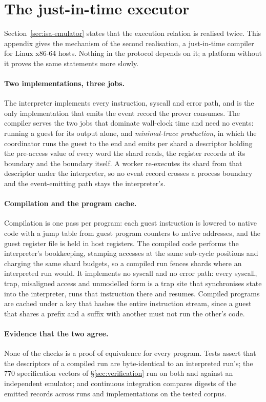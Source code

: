 \section{The just-in-time executor}
\label{sec:executor}

Section~\ref{sec:isa-emulator} states that the execution relation is realised twice. This appendix gives the mechanism of the second realisation, a just-in-time compiler for Linux x86-64 hosts. Nothing in the protocol depends on it; a platform without it proves the same statements more slowly.

\paragraph{Two implementations, three jobs.}\label{sec:exec-roles} The interpreter implements every instruction, syscall and error path, and is the only implementation that emits the event record the prover consumes. The compiler serves the two jobs that dominate wall-clock time and need no events: running a guest for its output alone, and \emph{minimal-trace production}, in which the coordinator runs the guest to the end and emits per shard a descriptor holding the pre-access value of every word the shard reads, the register records at its boundary and the boundary itself. A worker re-executes its shard from that descriptor under the interpreter, so no event record crosses a process boundary and the event-emitting path stays the interpreter's.

\paragraph{Compilation and the program cache.}\label{sec:exec-transpile}\label{sec:exec-state}\label{sec:exec-accounting}\label{sec:exec-traps} Compilation is one pass per program: each guest instruction is lowered to native code with a jump table from guest program counters to native addresses, and the guest register file is held in host registers. The compiled code performs the interpreter's bookkeeping, stamping accesses at the same sub-cycle positions and charging the same shard budgets, so a compiled run fences shards where an interpreted run would. It implements no syscall and no error path: every syscall, trap, misaligned access and unmodelled form is a trap site that synchronises state into the interpreter, runs that instruction there and resumes. Compiled programs are cached under a key that hashes the entire instruction stream, since a guest that shares a prefix and a suffix with another must not run the other's code.

\paragraph{Evidence that the two agree.}\label{sec:exec-equivalence} None of the checks is a proof of equivalence for every program. Tests assert that the descriptors of a compiled run are byte-identical to an interpreted run's; the 770 specification vectors of \S\ref{sec:verification} run on both and against an independent emulator; and continuous integration compares digests of the emitted records across runs and implementations on the tested corpus.
